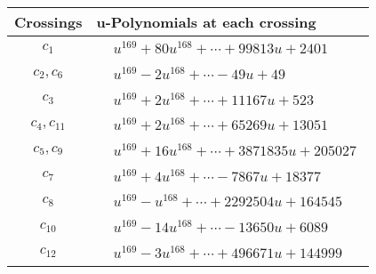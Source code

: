 \documentclass[1p]{elsarticle_modified}
\theoremstyle{definition}
\begin{document}
\begin{tabular}{m{50pt}|m{274pt}}
Crossings & \hspace{64pt}u-Polynomials at each crossing \\
\hline $$\begin{aligned}c_{1}\end{aligned}$$&$\begin{aligned}
&u^{169}+80 u^{168}+\cdots+99813 u+2401
\end{aligned}$\\
\hline $$\begin{aligned}c_{2},c_{6}\end{aligned}$$&$\begin{aligned}
&u^{169}-2 u^{168}+\cdots-49 u+49
\end{aligned}$\\
\hline $$\begin{aligned}c_{3}\end{aligned}$$&$\begin{aligned}
&u^{169}+2 u^{168}+\cdots+11167 u+523
\end{aligned}$\\
\hline $$\begin{aligned}c_{4},c_{11}\end{aligned}$$&$\begin{aligned}
&u^{169}+2 u^{168}+\cdots+65269 u+13051
\end{aligned}$\\
\hline $$\begin{aligned}c_{5},c_{9}\end{aligned}$$&$\begin{aligned}
&u^{169}+16 u^{168}+\cdots+3871835 u+205027
\end{aligned}$\\
\hline $$\begin{aligned}c_{7}\end{aligned}$$&$\begin{aligned}
&u^{169}+4 u^{168}+\cdots-7867 u+18377
\end{aligned}$\\
\hline $$\begin{aligned}c_{8}\end{aligned}$$&$\begin{aligned}
&u^{169}- u^{168}+\cdots+2292504 u+164545
\end{aligned}$\\
\hline $$\begin{aligned}c_{10}\end{aligned}$$&$\begin{aligned}
&u^{169}-14 u^{168}+\cdots-13650 u+6089
\end{aligned}$\\
\hline $$\begin{aligned}c_{12}\end{aligned}$$&$\begin{aligned}
&u^{169}-3 u^{168}+\cdots+496671 u+144999
\end{aligned}$\\
\hline
\end{tabular}\\~\\
\end{document}
